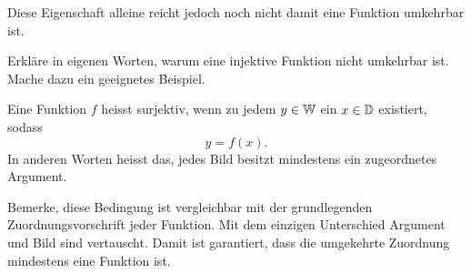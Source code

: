 \documentclass[11pt,oneside]{article}
\begin{document}
\begin{aufgabe}
\begin{minipage}{0.45\linewidth}
		\end{minipage}
	\end{aufgabe}
	Diese Eigenschaft alleine reicht jedoch noch nicht damit eine Funktion umkehrbar ist.
	\begin{aufgabe}
		Erkläre in eigenen Worten, warum eine injektive Funktion nicht umkehrbar ist. Mache dazu ein geeignetes Beispiel.
		\vspace{5pt}\newline{}
	\end{aufgabe}
	\begin{definition}
		Eine Funktion $f$ heisst surjektiv, wenn zu jedem $y\in\mathbb{W}$ ein $x\in\mathbb{D}$ existiert, sodass \[y=f(x).\]
		In anderen Worten heisst das, jedes Bild besitzt mindestens ein zugeordnetes Argument.
	\end{definition}
	Bemerke, diese Bedingung ist vergleichbar mit der grundlegenden Zuordnungsvorschrift jeder Funktion. Mit dem einzigen Unterschied Argument und Bild sind vertauscht. Damit ist garantiert, dass die umgekehrte Zuordnung mindestens eine Funktion ist.
\newpage
\end{document}

